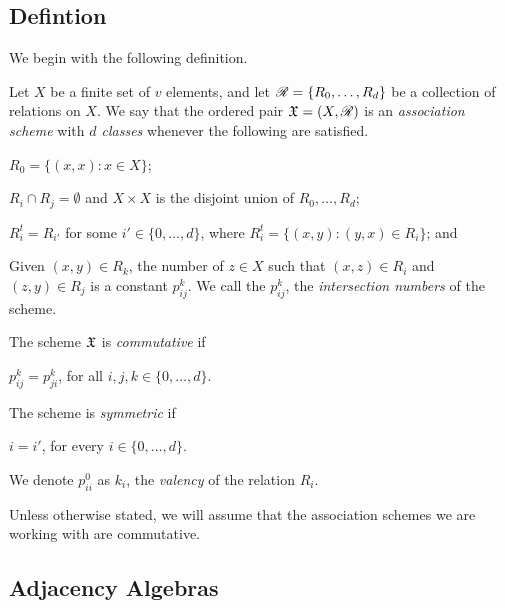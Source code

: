 \documentclass[../../../main]{subfiles}
\begin{document}

\subsection{Defintion}

 We begin with the following definition.
 
 \begin{defin}\label{ass-scheme-def}
  Let $X$ be a finite set of $v$ elements, and let $\mathscr{R}=\{R_0, \dots, R_d\}$ be a collection of relations on $X$. We say that the ordered pair $\mathfrak{X}=(X,\mathscr{R})$ is an {\it association scheme} with {\it $d$ classes} whenever the following are satisfied.
  \begin{defenum}
   \item $R_0=\{(x,x) : x \in X\}$;
   \item $R_i \cap R_j = \emptyset$ and $X \times X$ is the disjoint union of $R_0, \dots, R_d$;
   \item $R_i^t=R_{i'}$ for some $i' \in \{0, \dots, d\}$, where $R_i^t=\{(x,y) : (y,x) \in R_i\}$; and
   \item Given $(x,y) \in R_k$, the number of $z \in X$ such that $(x,z) \in R_i$ and $(z,y) \in R_j$ is a constant $p_{ij}^k$. We call the $p_{ij}^k$, the {\it intersection numbers} of the scheme.
  \end{defenum}
  The scheme $\mathfrak{X}$ is {\it commutative} if
  \begin{defenum}[resume]
   \item $p_{ij}^k=p_{ji}^k$, for all $i,j,k \in \{0, \dots, d\}$.
  \end{defenum}
  The scheme is {\it symmetric} if
  \begin{defenum}[resume]
   \item $i=i'$, for every $i \in \{0, \dots, d\}$.
  \end{defenum}
  We denote $p_{ii}^0$ as $k_i$, the {\it valency} of the relation $R_i$.
 \end{defin}
 
 Unless otherwise stated, we will assume that the association schemes we are working with are commutative. 
 
 \dinkus


\subsection{Adjacency Algebras} 
\end{document}
